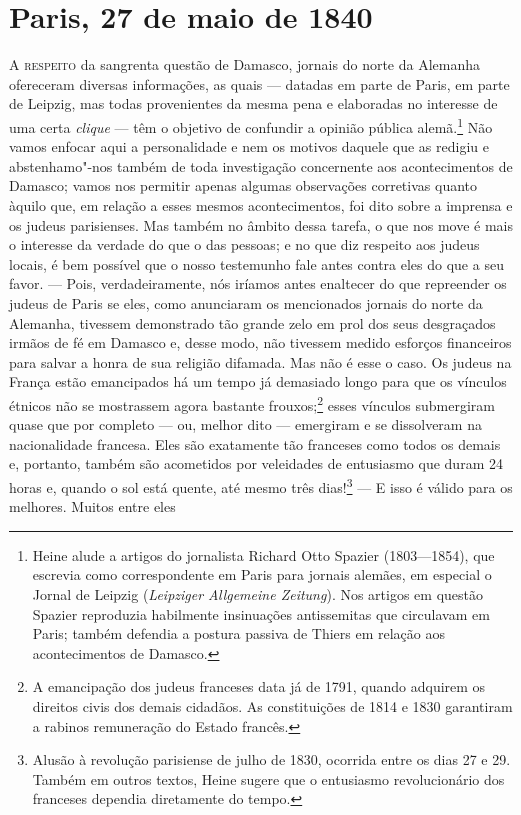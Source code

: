 \chapter{Paris, 27 de maio de 1840}

\textsc{A respeito} da sangrenta questão de Damasco, jornais do norte da
Alemanha ofereceram diversas informações, as quais --- datadas em parte
de Paris, em parte de Leipzig, mas todas provenientes da mesma pena e
elaboradas no interesse de uma certa \textit{clique} --- têm o objetivo
de confundir a opinião pública alemã.\footnote{ Heine alude a artigos
do jornalista Richard Otto Spazier (1803---1854), que escrevia como
correspondente em Paris para jornais alemães, em especial o Jornal de
Leipzig (\textit{Leipziger Allgemeine Zeitung}). Nos artigos em questão
Spazier reproduzia habilmente insinuações antissemitas que circulavam
em Paris; também defendia a postura passiva de Thiers em relação aos
acontecimentos de Damasco.} Não vamos enfocar aqui a
personalidade e nem os motivos daquele que as redigiu e
abstenhamo"-nos também de toda investigação concernente aos
acontecimentos de Damasco; vamos nos permitir apenas algumas
observações corretivas quanto àquilo que, em relação a esses mesmos
acontecimentos, foi dito sobre a imprensa e os judeus parisienses. Mas
também no âmbito dessa tarefa, o que nos move é mais o interesse da
verdade do que o das pessoas; e no que diz respeito aos judeus locais,
é bem possível que o nosso testemunho fale antes contra eles do que a
seu favor. --- Pois, verdadeiramente, nós iríamos antes enaltecer do que
repreender os judeus de Paris se eles, como anunciaram os mencionados
jornais do norte da Alemanha, tivessem demonstrado tão grande zelo em
prol dos seus desgraçados irmãos de fé em Damasco e, desse modo, não
tivessem medido esforços financeiros para salvar a honra de sua
religião difamada. Mas não é esse o caso. Os judeus na França estão
emancipados há um tempo já demasiado longo para que os vínculos étnicos
não se mostrassem agora bastante frouxos;\footnote{ A emancipação dos
judeus franceses data já de 1791, quando adquirem os direitos civis dos
demais cidadãos. As constituições de 1814 e 1830 garantiram a rabinos
remuneração do Estado francês.} esses vínculos submergiram quase
que por completo --- ou, melhor dito --- emergiram e se dissolveram na
nacionalidade francesa. Eles são exatamente tão franceses como todos os
demais e, portanto, também são acometidos por veleidades de entusiasmo
que duram 24 horas e, quando o sol está quente, até mesmo
três dias!\footnote{ Alusão à revolução parisiense de julho de 1830,
ocorrida entre os dias 27 e 29. Também em outros textos, Heine sugere
que o entusiasmo revolucionário dos franceses dependia diretamente do
tempo.} --- E isso é válido para os melhores. Muitos entre eles

